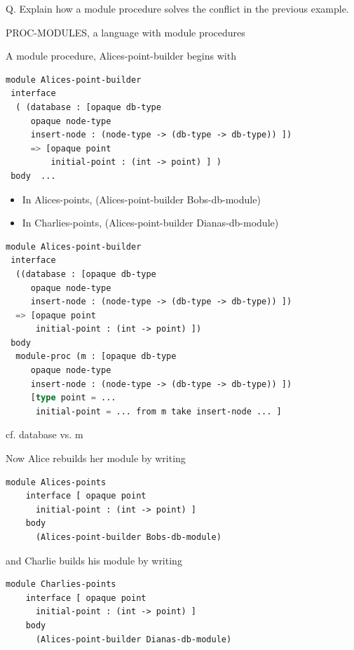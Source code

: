\documentclass{article}
\begin{document}
\begin{huge}
Q. Explain how a module procedure solves the conflict in the previous
example.

PROC-MODULES, a language with module procedures


A module procedure, Alices-point-builder begins with
\begin{lstlisting}[language=Lisp]
module Alices-point-builder
 interface
  ( (database : [opaque db-type
     opaque node-type
     insert-node : (node-type -> (db-type -> db-type)) ])
     => [opaque point
         initial-point : (int -> point) ] )
 body  ...      
\end{lstlisting} 

\begin{itemize}
\item In Alices-points, (Alices-point-builder Bobs-db-module)
\item In Charlies-points, (Alices-point-builder Dianas-db-module)
\end{itemize}


\begin{lstlisting}[language=Lisp]
module Alices-point-builder
 interface
  ((database : [opaque db-type
     opaque node-type
     insert-node : (node-type -> (db-type -> db-type)) ])
  => [opaque point
      initial-point : (int -> point) ])
 body
  module-proc (m : [opaque db-type
     opaque node-type
     insert-node : (node-type -> (db-type -> db-type)) ])
     [type point = ...
      initial-point = ... from m take insert-node ... ] 
\end{lstlisting}  

cf. database vs. m

Now Alice rebuilds her module by writing 
\begin{lstlisting}[language=Lisp]
   module Alices-points
    interface [ opaque point
      initial-point : (int -> point) ]
    body
      (Alices-point-builder Bobs-db-module)
\end{lstlisting} 

and Charlie builds his module by writing
\begin{lstlisting}[language=Lisp]
   module Charlies-points
    interface [ opaque point
      initial-point : (int -> point) ]
    body
      (Alices-point-builder Dianas-db-module)
\end{lstlisting} 


\end{huge}
\end{document}
